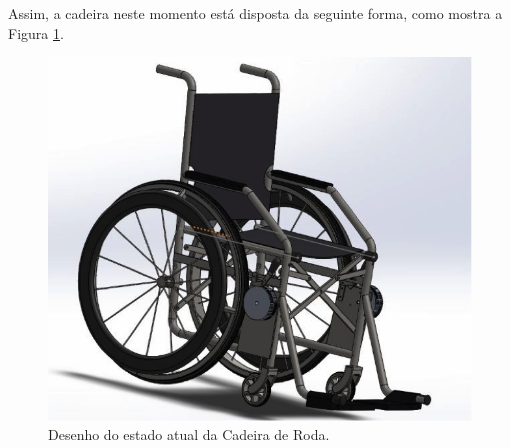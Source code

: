 Assim, a cadeira neste momento está disposta da seguinte forma, como mostra a
Figura \ref{fig:actual_state}.

\begin{figure}
    \begin{center}
        \includegraphics[scale=0.5]{figuras/actual_state.png}
    \end{center}
    \caption{Desenho do estado atual da Cadeira de Roda.}
    \label{fig:actual_state}
\end{figure}
